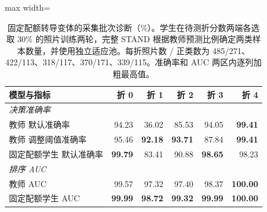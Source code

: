 \begin{table}[htbp]
\centering\small
\caption{固定配额转导变体的采集批次诊断（\%）。学生在待测折分数两端各选取 30\% 的照片训练两轮，完整 STAND 根据教师预测比例确定两类样本数量，并使用独立适应池。每折照片数 / 正类数为 485/271、422/113、318/117、370/171、339/115。准确率和 AUC 两区内逐列加粗最高值。}
\label{tab:trans}
\begin{adjustbox}{max width=\linewidth}
\begin{tabular}{lrrrrr}
\toprule
模型与指标 & 折 0 & 折 1 & 折 2 & 折 3 & 折 4\\
\midrule
\multicolumn{6}{l}{\textit{决策准确率}}\\
\addlinespace[2pt]
教师 默认准确率 & 94.23 & 36.02 & 85.53 & 94.05 & \textbf{99.41}\\
教师 调整阈值准确率 & 95.46 & \textbf{92.18} & \textbf{93.71} & 87.84 & \textbf{99.41}\\
固定配额学生 默认准确率 & \textbf{99.79} & 83.41 & 90.88 & \textbf{98.65} & 98.23\\
\midrule
\multicolumn{6}{l}{\textit{排序 AUC}}\\
\addlinespace[2pt]
教师 AUC & 99.57 & 97.32 & 97.40 & 98.37 & \textbf{100.00}\\
固定配额学生 AUC & \textbf{99.99} & \textbf{98.72} & \textbf{99.32} & \textbf{99.99} & \textbf{100.00}\\
\bottomrule
\end{tabular}
\end{adjustbox}
\end{table}
